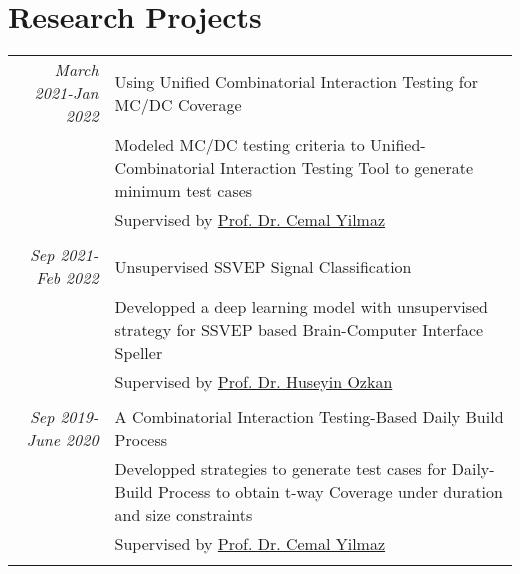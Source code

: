 \documentclass[a4paper,10pt]{article} %
\begin{document}


\section{Research Projects}

\begin{longtable}{r|p{11cm}}
\emph{March 2021-Jan 2022} & Using Unified Combinatorial Interaction Testing for MC/DC Coverage\\
& \footnotesize{Modeled MC/DC testing criteria to Unified-Combinatorial Interaction Testing Tool to generate minimum test cases}\\
& \footnotesize{Supervised by \href{mailto:cyilmaz@sabanciuniv.edu}{Prof. Dr. Cemal Yilmaz}}\\
\multicolumn{2}{c}{} \\

\emph{Sep 2021-Feb 2022} & Unsupervised SSVEP Signal Classification\\
& \footnotesize{Developped a deep learning model with unsupervised strategy for SSVEP based Brain-Computer Interface Speller}\\
& \footnotesize{Supervised by \href{mailto:hozkan@sabanciuniv.edu}{Prof. Dr. Huseyin Ozkan}}\\
\multicolumn{2}{c}{} \\

\emph{Sep 2019-June 2020} & A Combinatorial Interaction Testing-Based Daily Build Process\\
& \footnotesize{Developped strategies to generate test cases for Daily-Build Process to obtain t-way Coverage under duration and size constraints}\\
& \footnotesize{Supervised by \href{mailto:cyilmaz@sabanciuniv.edu}{Prof. Dr. Cemal Yilmaz}}\\
\multicolumn{2}{c}{} \\
\end{longtable}



\end{document}
